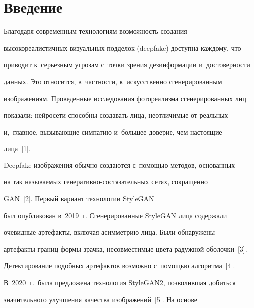 \section{Введение}





\vspace*{-4pt}





  Благодаря современным технологиям возможность создания 


высокореалистичных визуальных подделок (deepfake) доступна каждому, что 


приводит к~серь\-ез\-ным угрозам с~точки зрения дезинформации и~достоверности 


данных. Это относится, в~частности, к~искусственно сгенерированным 


изображениям. Проведенные исследования фотореализма сгенерированных лиц 


показали: нейросети способны создавать лица, неотличимые от реальных 


и,~главное, вызывающие симпатию и~большее доверие, чем настоящие 


лица~[1].


  


  Deepfake-изображения обычно создаются с~помощью методов, основанных 


на так называемых ге\-не\-ра\-тив\-но-со\-стя\-за\-тель\-ных сетях, сокращенно 


GAN~[2]. Первый вариант технологии StyleGAN 


был опубликован в~2019~г. Сгенерированные StyleGAN лица содержали 


очевидные артефакты, включая асимметрию лица. Были обнаружены 


артефакты границ формы зрачка, несовместимые цвета радужной оболочки~[3]. 


Детектирование подобных артефактов возможно с~помощью алгоритма~[4]. 


В~2020~г.\ была предложена технология StyleGAN2, позволившая добиться 


значительного улучшения качества изображений~[5]. На основе\linebreak\vspace*{-12pt}





\pagebreak





